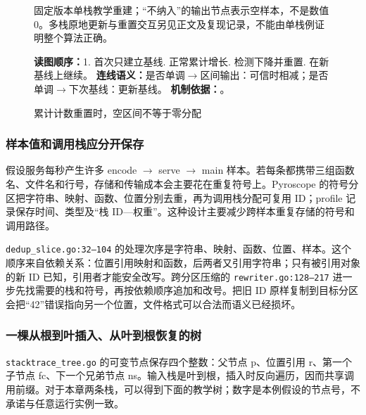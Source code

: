 \documentclass[UTF8,fontset=fandol,openany,11pt]{ctexbook}
\begin{document}
\begin{figure}[H]
\caption{累计计数重置时，空区间不等于零分配}\label{fig:15-delta-reset}
\begin{minipage}{0.96\linewidth}\footnotesize 固定版本单栈教学重建；“不纳入”的输出节点表示空样本，不是数值 0。多栈原地更新与重置交互另见正文及复现记录，不能由单栈例证明整个算法正确。

\textbf{读图顺序：}1. 首次只建立基线. 正常累计增长. 检测下降并重置. 在新基线上继续。
\textbf{连线语义：}是否单调\ensuremath{\rightarrow}\allowbreak{}区间输出：可信时相减；是否单调\ensuremath{\rightarrow}\allowbreak{}下次基线：更新基线。
\textbf{机制依据：}\cite{proj-pyro-delta}。
\end{minipage}
\end{figure}
\subsubsection{样本值和调用栈应分开保存}
假设服务每秒产生许多 encode \ensuremath{\rightarrow}\allowbreak{} serve \ensuremath{\rightarrow}\allowbreak{} main 样本。若每条都携带三组函数名、文件名和行号，存储和传输成本会主要花在重复符号上。Pyroscope 的符号分区把字符串、映射、函数、位置分别去重，再为调用栈分配可复用 ID；profile 记录保存时间、类型及“栈 ID—权重”。这种设计主要减少跨样本重复存储的符号和调用路径。\cite{proj-pyroscope-store}

\texttt{dedup\_\allowbreak{}slice.\allowbreak{}go:\allowbreak{}32–104} 的处理次序是字符串、映射、函数、位置、样本。这个顺序来自依赖关系：位置引用映射和函数，后两者又引用字符串；只有被引用对象的新 ID 已知，引用者才能安全改写。跨分区压缩的 \texttt{rewriter.\allowbreak{}go:\allowbreak{}128–217} 进一步先找需要的栈和符号，再按依赖顺序追加和改号。把旧 ID 原样复制到目标分区会把“42”错误指向另一个位置，文件格式可以合法而语义已经损坏。

\subsubsection{一棵从根到叶插入、从叶到根恢复的树}
\texttt{stacktrace\_\allowbreak{}tree.\allowbreak{}go} 的可变节点保存四个整数：父节点 p、位置引用 r、第一个子节点 fc、下一个兄弟节点 ns。输入栈是叶到根，插入时反向遍历，因而共享调用前缀。对于本章两条栈，可以得到下面的教学树；数字是本例假设的节点号，不承诺与任意运行实例一致。
\end{document}
